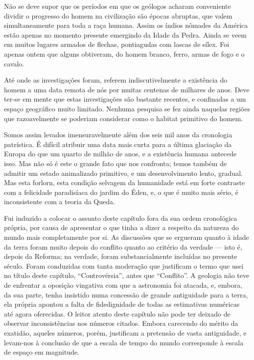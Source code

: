 \documentclass[11pt,a5paper,twoside,openany]{book}
\begin{document}
Não se deve supor que os períodos em que os geólogos acharam conveniente dividir o progresso do homem na civilização são épocas abruptas, que valem simultaneamente para toda a raça humana. Assim os índios nômades da América estão apenas no momento presente emergindo da Idade da Pedra. Ainda se veem em muitos lugares armados de flechas, pontiagudas com lascas de sílex. Foi apenas ontem que alguns obtiveram, do homem branco, ferro, armas de fogo e o cavalo.

Até onde as investigações foram, referem indiscutivelmente a existência do homem a uma data remota de nós por muitas centenas de milhares de anos. Deve ter-se em mente que estas investigações são bastante recentes, e confinadas a um espaço geográfico muito limitado. Nenhuma pesquisa se fez ainda naquelas regiões que razoavelmente se poderiam considerar como o habitat primitivo do homem.

Somos assim levados imensuravelmente além dos seis mil anos da cronologia patrística. É difícil atribuir uma data mais curta para a última glaciação da Europa do que um quarto de milhão de anos, e a existência humana antecede isso. Mas não só é este o grande fato que nos confronta; temos também de admitir um estado animalizado primitivo, e um desenvolvimento lento, gradual. Mas esta forlorn, esta condição selvagem da humanidade está em forte contraste com a felicidade paradisíaca do jardim do Éden, e, o que é muito mais sério, é inconsistente com a teoria da Queda.

Fui induzido a colocar o assunto deste capítulo fora da sua ordem cronológica própria, por causa de apresentar o que tinha a dizer a respeito da natureza do mundo mais completamente por si. As discussões que se ergueram quanto à idade da terra foram muito depois do conflito quanto ao critério da verdade — isto é, depois da Reforma; na verdade, foram substancialmente incluídas no presente século. Foram conduzidas com tanta moderação que justificam o termo que usei no título deste capítulo, “Controvérsia”, antes que “Conflito”. A geologia não teve de enfrentar a oposição vingativa com que a astronomia foi atacada, e, embora, da sua parte, tenha insistido numa concessão de grande antiguidade para a terra, ela própria apontou a falta de fidedignidade de todas as estimativas numéricas até agora oferecidas. O leitor atento deste capítulo não pode ter deixado de observar inconsistências nos números citados. Embora carecendo do mérito da exatidão, aqueles números, porém, justificam a pretensão de vasta antiguidade, e levam-nos à conclusão de que a escala de tempo do mundo corresponde à escala de espaço em magnitude.
\end{document}
